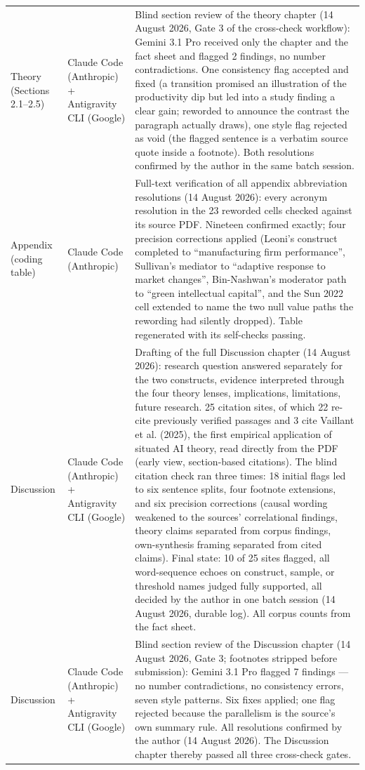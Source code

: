 \begin{longtable}{@{}p{2.9cm}p{3.2cm}p{9.0cm}@{}}
\addlinespace
Theory (Sections 2.1--2.5) & Claude Code (Anthropic) + Antigravity CLI (Google) & Blind section review of the theory chapter (14 August 2026, Gate 3 of the cross-check workflow): Gemini 3.1 Pro received only the chapter and the fact sheet and flagged 2 findings, no number contradictions. One consistency flag accepted and fixed (a transition promised an illustration of the productivity dip but led into a study finding a clear gain; reworded to announce the contrast the paragraph actually draws), one style flag rejected as void (the flagged sentence is a verbatim source quote inside a footnote). Both resolutions confirmed by the author in the same batch session. \\
\addlinespace
Appendix (coding table) & Claude Code (Anthropic) & Full-text verification of all appendix abbreviation resolutions (14 August 2026): every acronym resolution in the 23 reworded cells checked against its source PDF. Nineteen confirmed exactly; four precision corrections applied (Leoni's construct completed to ``manufacturing firm performance'', Sullivan's mediator to ``adaptive response to market changes'', Bin-Nashwan's moderator path to ``green intellectual capital'', and the Sun 2022 cell extended to name the two null value paths the rewording had silently dropped). Table regenerated with its self-checks passing. \\
\addlinespace
Discussion & Claude Code (Anthropic) + Antigravity CLI (Google) & Drafting of the full Discussion chapter (14 August 2026): research question answered separately for the two constructs, evidence interpreted through the four theory lenses, implications, limitations, future research. 25 citation sites, of which 22 re-cite previously verified passages and 3 cite Vaillant et al. (2025), the first empirical application of situated AI theory, read directly from the PDF (early view, section-based citations). The blind citation check ran three times: 18 initial flags led to six sentence splits, four footnote extensions, and six precision corrections (causal wording weakened to the sources' correlational findings, theory claims separated from corpus findings, own-synthesis framing separated from cited claims). Final state: 10 of 25 sites flagged, all word-sequence echoes on construct, sample, or threshold names judged fully supported, all decided by the author in one batch session (14 August 2026, durable log). All corpus counts from the fact sheet. \\
\addlinespace
Discussion & Claude Code (Anthropic) + Antigravity CLI (Google) & Blind section review of the Discussion chapter (14 August 2026, Gate 3; footnotes stripped before submission): Gemini 3.1 Pro flagged 7 findings --- no number contradictions, no consistency errors, seven style patterns. Six fixes applied; one flag rejected because the parallelism is the source's own summary rule. All resolutions confirmed by the author (14 August 2026). The Discussion chapter thereby passed all three cross-check gates. \\

\end{longtable}
